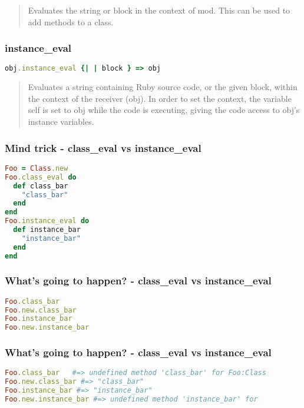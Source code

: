 \documentclass[serif,mathserif]{article}
\begin{document}
\begin{quote}
Evaluates the string or block in the context of mod. This can be used to add methods to a class.
\end{quote}


\subsubsection{instance\_eval}
\begin{lstlisting}[language=ruby]
obj.instance_eval {| | block } => obj
\end{lstlisting}

\begin{quote}
Evaluates a string containing Ruby source code, or the given block, within the context of the receiver (obj). In order to set the context, the variable self is set to obj while the code is executing, giving the code access to obj’s instance variables.
\end{quote}

\subsubsection{Mind trick - class\_eval vs instance\_eval}

\begin{lstlisting}[language=ruby]
Foo = Class.new
Foo.class_eval do
  def class_bar
    "class_bar"
  end
end
Foo.instance_eval do
  def instance_bar
    "instance_bar"
  end
end
\end{lstlisting}

\subsubsection{What's going to happen? - class\_eval vs instance\_eval}
\begin{lstlisting}[language=ruby]
Foo.class_bar
Foo.new.class_bar 
Foo.instance_bar
Foo.new.instance_bar
\end{lstlisting}


\subsubsection{What's going to happen? - class\_eval vs instance\_eval}
\begin{lstlisting}[language=ruby]
Foo.class_bar   #=> undefined method 'class_bar' for Foo:Class
Foo.new.class_bar #=> "class_bar"
Foo.instance_bar #=> "instance_bar"
Foo.new.instance_bar #=> undefined method 'instance_bar' for
\end{lstlisting}
\end{document}
